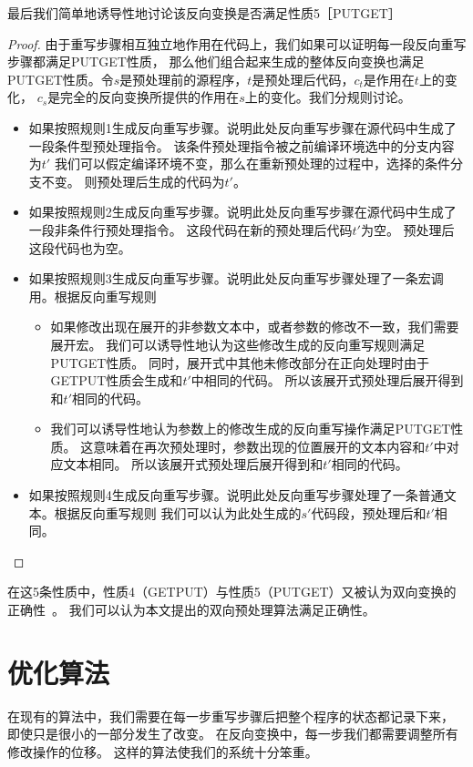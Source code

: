 最后我们简单地诱导性地讨论该反向变换是否满足性质5［PUTGET］
\begin{proof}
由于重写步骤相互独立地作用在代码上，我们如果可以证明每一段反向重写步骤都满足PUTGET性质，
那么他们组合起来生成的整体反向变换也满足PUTGET性质。令$s$是预处理前的源程序，$t$是预处理后代码，$c_t$是作用在$t$上的变化，
$c_s$是完全的反向变换所提供的作用在$s$上的变化。我们分规则讨论。

\begin{itemize}
  \item 如果按照规则1生成反向重写步骤。说明此处反向重写步骤在源代码中生成了一段条件型预处理指令。
  该条件预处理指令被之前编译环境选中的分支内容为$t'$
  我们可以假定编译环境不变，那么在重新预处理的过程中，选择的条件分支不变。
  则预处理后生成的代码为$t'$。

  \item 如果按照规则2生成反向重写步骤。说明此处反向重写步骤在源代码中生成了一段非条件行预处理指令。
  这段代码在新的预处理后代码$t'$为空。
  预处理后这段代码也为空。

  \item 如果按照规则3生成反向重写步骤。说明此处反向重写步骤处理了一条宏调用。根据反向重写规则
  \begin{itemize}
  \item 如果修改出现在展开的非参数文本中，或者参数的修改不一致，我们需要展开宏。
  我们可以诱导性地认为这些修改生成的反向重写规则满足PUTGET性质。
  同时，展开式中其他未修改部分在正向处理时由于GETPUT性质会生成和$t'$中相同的代码。
  所以该展开式预处理后展开得到和$t'$相同的代码。
  \item 我们可以诱导性地认为参数上的修改生成的反向重写操作满足PUTGET性质。
  这意味着在再次预处理时，参数出现的位置展开的文本内容和$t'$中对应文本相同。
  所以该展开式预处理后展开得到和$t'$相同的代码。
  \end{itemize}

  \item 如果按照规则4生成反向重写步骤。说明此处反向重写步骤处理了一条普通文本。根据反向重写规则
  我们可以认为此处生成的$s'$代码段，预处理后和$t'$相同。
\end{itemize}
\end{proof}

在这5条性质中，性质4（GETPUT）与性质5（PUTGET）又被认为双向变换的正确性~\parencite{Foster:2007}。
我们可以认为本文提出的双向预处理算法满足正确性。

\section{优化算法}\label{sec:optimization}
在现有的算法中，我们需要在每一步重写步骤后把整个程序的状态都记录下来，
即使只是很小的一部分发生了改变。
在反向变换中，每一步我们都需要调整所有修改操作的位移。
这样的算法使我们的系统十分笨重。


